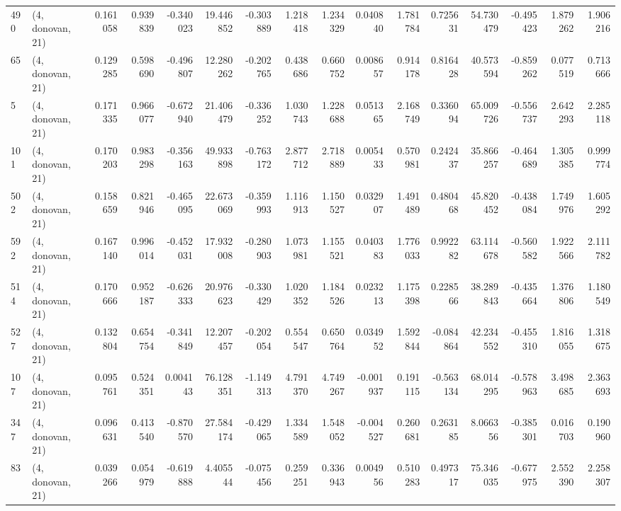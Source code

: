 \begin{tabular}{llrrrrrrrrrrrrrr}
490 &  (4, donovan, 21) &   0.161058 &  0.939839 & -0.340023 &   19.446852 & -0.303889 &   1.218418 &   1.234329 &  0.040840 &  1.781784 &  0.725631 &   54.730479 & -0.495423 &   1.879262 &   1.906216 \\
65  &  (4, donovan, 21) &   0.129285 &  0.598690 & -0.496807 &   12.280262 & -0.202765 &   0.438686 &   0.660752 &  0.008657 &  0.914178 &  0.816428 &   40.573594 & -0.859262 &   0.077519 &   0.713666 \\
5   &  (4, donovan, 21) &   0.171335 &  0.966077 & -0.672940 &   21.406479 & -0.336252 &   1.030743 &   1.228688 &  0.051365 &  2.168749 &  0.336094 &   65.009726 & -0.556737 &   2.642293 &   2.285118 \\
101 &  (4, donovan, 21) &   0.170203 &  0.983298 & -0.356163 &   49.933898 & -0.763172 &   2.877712 &   2.718889 &  0.005433 &  0.570981 &  0.242437 &   35.866257 & -0.464689 &   1.305385 &   0.999774 \\
502 &  (4, donovan, 21) &   0.158659 &  0.821946 & -0.465095 &   22.673069 & -0.359993 &   1.116913 &   1.150527 &  0.032907 &  1.491489 &  0.480468 &   45.820452 & -0.438084 &   1.749976 &   1.605292 \\
592 &  (4, donovan, 21) &   0.167140 &  0.996014 & -0.452031 &   17.932008 & -0.280903 &   1.073981 &   1.155521 &  0.040383 &  1.776033 &  0.992282 &   63.114678 & -0.560582 &   1.922566 &   2.111782 \\
514 &  (4, donovan, 21) &   0.170666 &  0.952187 & -0.626333 &   20.976623 & -0.330429 &   1.020352 &   1.184526 &  0.023213 &  1.175398 &  0.228566 &   38.289843 & -0.435664 &   1.376806 &   1.180549 \\
527 &  (4, donovan, 21) &   0.132804 &  0.654754 & -0.341849 &   12.207457 & -0.202054 &   0.554547 &   0.650764 &  0.034952 &  1.592844 & -0.084864 &   42.234552 & -0.455310 &   1.816055 &   1.318675 \\
107 &  (4, donovan, 21) &   0.095761 &  0.524351 &  0.004143 &   76.128351 & -1.149313 &   4.791370 &   4.749267 & -0.001937 &  0.191115 & -0.563134 &   68.014295 & -0.578963 &   3.498685 &   2.363693 \\
347 &  (4, donovan, 21) &   0.096631 &  0.413540 & -0.870570 &   27.584174 & -0.429065 &   1.334589 &   1.548052 & -0.004527 &  0.260681 &  0.263185 &    8.066356 & -0.385301 &   0.016703 &   0.190960 \\
83  &  (4, donovan, 21) &   0.039266 &  0.054979 & -0.619888 &    4.405544 & -0.075456 &   0.259251 &   0.336943 &  0.004956 &  0.510283 &  0.497317 &   75.346035 & -0.677975 &   2.552390 &   2.258307 \\

\end{tabular}
